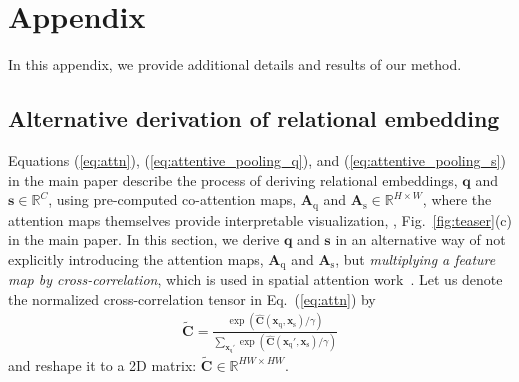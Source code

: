 \documentclass[10pt,twocolumn,letterpaper]{article}
\newcommand{\Real}{\mathbb{R}}
\newcommand{\bs}{\mathbf{s}}
\newcommand{\bC}{\mathbf{C}}
\newcommand{\bq}{\mathbf{q}}
\newcommand{\bA}{\mathbf{A}}
\newcommand{\bx}{\mathbf{x}}
\newcommand{\texts}{{\text{s}}}
\newcommand{\textq}{{\text{q}}}
\begin{document}
\clearpage
\renewcommand{\theequation}{a.\arabic{equation}}
\renewcommand{\thetable}{a.\arabic{table}}
\renewcommand{\thefigure}{a.\arabic{figure}}
\renewcommand*{\thefootnote}{\arabic{footnote}}
\renewcommand\thesection{\Alph{section}}
\setcounter{section}{0}
\section{Appendix}
In this appendix, we provide additional details and results of our method.

\subsection{Alternative derivation of relational embedding}
Equations (\ref{eq:attn}), (\ref{eq:attentive_pooling_q}), and (\ref{eq:attentive_pooling_s}) in the main paper describe the process of deriving relational embeddings, $\bq$ and $\bs \in \Real^{C}$, using pre-computed co-attention maps, $\bA_\textq$ and $\bA_\texts \in \Real^{H \times W}$, where the attention maps themselves provide interpretable visualization, \eg, Fig.~\ref{fig:teaser}(c) in the main paper.
In this section, we derive $\bq$ and $\bs$ in an alternative way of not explicitly introducing the attention maps, $\bA_\textq$ and $\bA_\texts$, but \textit{multiplying a feature map by cross-correlation}, which is used in spatial attention work~\cite{sun2020mining, dualattentionnet, superglue}.
Let us denote the normalized cross-correlation tensor in Eq.~(\ref{eq:attn}) by 
\begin{eqnarray}
\tilde{\bC} = \frac{\exp{(\hat{\bC}(\bx_\textq, \bx_\texts) / \gamma)} }{\sum_{\bx_\textq'}
	\exp{(\hat{\bC}(\bx_\textq', \bx_\texts) / \gamma)}}
\end{eqnarray}
and reshape it to a 2D matrix: $\tilde{\bC} \in \Real^{HW \times HW}$.
\end{document}
